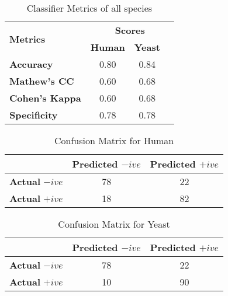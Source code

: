 \documentclass{article}
\begin{document}


\begin{table}[h!tbp]
  \centering
  \renewcommand{\arraystretch}{1.2}
  \begin{tabular}{lccc}
    \toprule
    \multirow{2}{*}{\textbf{Metrics}} & \multicolumn{3}{c}{\textbf{Scores}} \\
    \cmidrule(lr){2-4}
    & \textbf{Human}& \textbf{Yeast} \\
    \midrule
    \textbf{Accuracy} & 0.80& 0.84 \\
    \textbf{Mathew's CC} & 0.60& 0.68 \\
    \textbf{Cohen's Kappa} & 0.60& 0.68 \\
    \textbf{Specificity} & 0.78& 0.78 \\
    \bottomrule
  \end{tabular}
  \caption{Classifier Metrics of all species}
\end{table}

\vspace{100pt}


\begin{table}[h!tbp]

\centering
\renewcommand{\arraystretch}{1.2}

\begin{tabular}{rcc}
  \toprule
  & \textbf{Predicted} $-ive$ & \textbf{Predicted} $+ive$ \\
  \midrule
  \textbf{Actual} $-ive$ & 78 & 22 \\
  \textbf{Actual} $+ive$ & 18 & 82 \\
  \bottomrule
\end{tabular}

\caption{Confusion Matrix for Human}
\end{table}


\begin{table}[h!tbp]

\centering
\renewcommand{\arraystretch}{1.2}

\begin{tabular}{rcc}
  \toprule
  & \textbf{Predicted} $-ive$ & \textbf{Predicted} $+ive$ \\
  \midrule
  \textbf{Actual} $-ive$ & 78 & 22 \\
  \textbf{Actual} $+ive$ & 10 & 90 \\
  \bottomrule
\end{tabular}

\caption{Confusion Matrix for Yeast}
\end{table}
\end{document}
